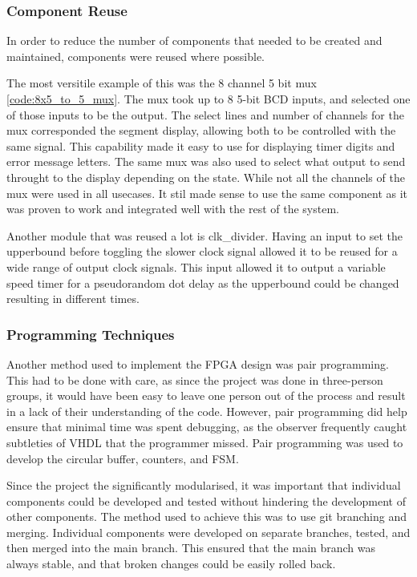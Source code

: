 \documentclass[11pt]{article}
\begin{document}

\subsubsection{Component Reuse}

In order to reduce the number of components that needed to be created and maintained, components were reused where possible. 

The most versitile example of this was the 8 channel 5 bit mux \ref{code:8x5_to_5_mux}. The mux took up to 8 5-bit BCD inputs, and selected one of those inputs to be the output. The select lines and number of channels for the mux corresponded the segment display, allowing both to be controlled with the same signal. This capability made it easy to use for displaying timer digits and error message letters. The same mux was also used to select what output to send throught to the display depending on the state. While not all the channels of the mux were used in all usecases. It stil made sense to use the same component as it was proven to work and integrated well with the rest of the system.

Another module that was reused a lot is clk_divider. Having an input to set the upperbound before toggling the slower clock signal allowed it to be reused for a wide range of output clock signals. This input allowed it to output a variable speed timer for a pseudorandom dot delay as the upperbound could be changed resulting in different times.

\subsubsection{Programming Techniques}

Another method used to implement the FPGA design was pair programming. This had to be done with care, as since the project was done in three-person groups, it would have been easy to leave one person out of the process and result in a lack of their understanding of the code. However, pair programming did help ensure that minimal time was spent debugging, as the observer frequently caught subtleties of VHDL that the programmer missed. Pair programming was used to develop the circular buffer, counters, and FSM.

Since the project the significantly modularised, it was important that individual components could be developed and tested without hindering the development of other components. The method used to achieve this was to use git branching and merging. Individual components were developed on separate branches, tested, and then merged into the main branch. This ensured that the main branch was always stable, and that broken changes could be easily rolled back.
\end{document}
